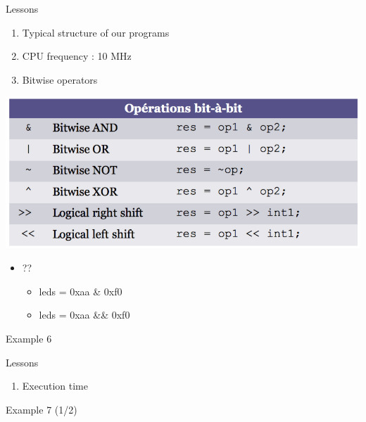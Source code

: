 \begin{frame}{Lessons}

\begin{enumerate}
\def\labelenumi{\arabic{enumi}.}
\tightlist
\item
  Typical structure of our programs
\item
  CPU frequency : 10 MHz
\item
  Bitwise operators
\end{enumerate}

\begin{center}
\includegraphics[width=.7\textwidth]{images/logique2.png}
\end{center}

\begin{itemize}
\tightlist
\item
  ??

  \begin{itemize}
  \tightlist
  \item
    leds = 0xaa \& 0xf0
  \item
    leds = 0xaa \&\& 0xf0
  \end{itemize}
\end{itemize}

\end{frame}

\begin{frame}{Example 6}



\end{frame}

\begin{frame}{Lessons}

\begin{enumerate}
\def\labelenumi{\arabic{enumi}.}
\tightlist
\item
  Execution time
\end{enumerate}

\end{frame}

\begin{frame}{Example 7 (1/2)}



\end{frame}

